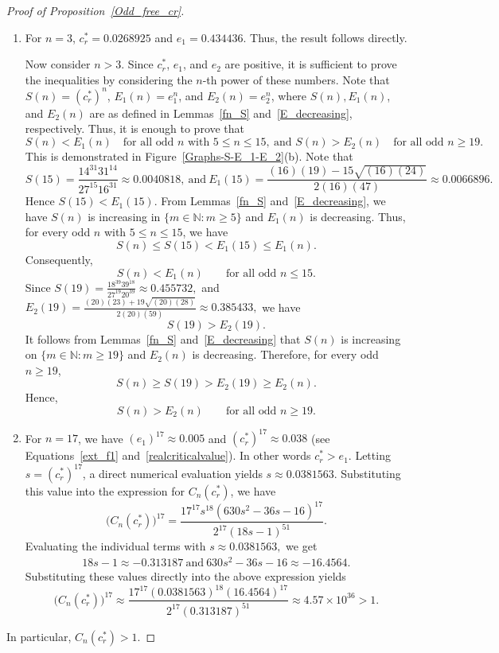 \documentclass[12pt]{article}
\begin{document}
	\begin{proof}[Proof of Proposition~\ref{Odd_free_cr}]
	\begin{enumerate}
		\item For $n=3$, $c_r^*=0.0268925$ and $e_1= 0.434436$. Thus, the result follows directly. 
		
		Now consider $n>3$. Since $c_r^*$, $e_1$, and $e_2$ are positive, it is sufficient to prove the inequalities by considering the $n$-th power of these numbers. Note that $S(n)=(c_r^*)^n$, $E_1(n)=e_1^n$, and $E_2(n)=e_2^n$, where $S(n),E_1(n)$, and $E_2(n)$ are as defined in Lemmas~\ref{fn_S} and~\ref{E_decreasing}, respectively. Thus, it is enough to prove that
		 $$S(n)<E_1(n)\quad \text{for all odd } n \text{ with } 5 \leq n\leq 15,~\mbox{and }
		  S(n)>E_2(n)\quad \text{for all odd } n\geq 19.$$ 
		  This is demonstrated in Figure~\ref{Graphs-S-E_1-E_2}(b).
		Note that
		$$S(15)=\frac{14^{31}  31^{14}}{27^{15}  16^{31}}\approx 0.0040818,~\mbox{and}~
		 E_1(15)=\frac{(16)(19)-15\sqrt{(16)(24)}}{2(16)(47)} \approx 0.0066896.$$
		Hence $S(15)<E_1(15).$
		From Lemmas~\ref{fn_S} and~\ref{E_decreasing}, we have $S(n)$ is increasing in $\{m \in \mathbb{N}:m \geq 5 \}$ and $E_1(n)$ is decreasing.
		Thus, for every odd $n$ with $5\leq n\le15$, we have
		$$S(n)\le S(15)<E_1(15)\le E_1(n).$$
		Consequently,
		$$S(n)<E_1(n) \qquad \text{for all odd } n\le15.$$
		Since   $S(19)=\frac{18^{39} 39^{18}}{27^{19} 20^{39}} \approx 0.455732,$ 
		and	$E_2(19)=\frac{(20)(23)+19\sqrt{(20)(28)}}{2(20)(59)} \approx 0.385433,$ we have
		$$S(19)>E_2(19).$$
		It follows from Lemmas~\ref{fn_S} and~\ref{E_decreasing} that $S(n)$ is increasing on $\{m \in \mathbb{N}:m \geq 19 \}$ and $E_2(n)$ is decreasing. 
		Therefore, for every odd $n\ge 19$,
		$$S(n)\ge S(19)>E_2(19)\ge E_2(n).$$
		Hence,
		$$S(n)>E_2(n) \qquad \text{for all odd } n\ge 19.$$
		\item 	For $n=17$, we have $(e_1 )^{17} \approx 0.005$ and  $(c_r ^*)^{17}\approx 0.038 $ (see Equations~\eqref{ext_f1} and~\eqref{realcriticalvalue}). In other words $c_r ^* > e_1$. Letting $s = (c_r ^*)^{17}$, a direct numerical evaluation yields $s \approx 0.0381563$. Substituting this value into the expression for $C_n (c_r ^*)$, we have
		$$\big(C_n(c_r ^*)\big)^{17} = \frac{17^{17} s^{18} (630s^2 - 36s - 16)^{17}}{2^{17} (18 s - 1)^{51}}.$$
		Evaluating the individual terms with $s \approx 0.0381563,$ we get 
		\begin{align*}
			18s - 1  \approx -0.313187 ~\mbox{and}~
			630 s^2 - 36s - 16  \approx -16.4564.
		\end{align*}
		Substituting these values directly into the above expression yields
		$$ \big(C_n(c_r^*)\big)^{17}  \approx \frac{17^{17} (0.0381563)^{18}  (16.4564)^{17}}{2^{17}  (0.313187)^{51}} \approx 4.57 \times 10^{36}>1.$$
	\end{enumerate}	
		In particular,  $C_n (c_r ^*) >1$.
	\end{proof}
	
\end{document}
